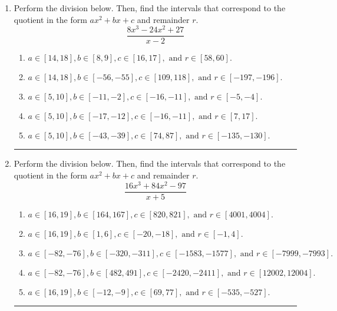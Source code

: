 \documentclass[14pt]{extbook}
\newcommand{\litem}[1]{\item#1\hspace*{-1cm}\rule{\textwidth}{0.4pt}}
\begin{document}
\begin{enumerate}
{\begin{enumerate}[label=\Alph*.]
\end{enumerate} }
\litem{
Perform the division below. Then, find the intervals that correspond to the quotient in the form $ax^2+bx+c$ and remainder $r$.\[ \frac{8x^{3} -24 x^{2} + 27}{x -2} \]\begin{enumerate}[label=\Alph*.]
\item \( a \in [14, 18], b \in [8, 9], c \in [16, 17], \text{ and } r \in [58, 60]. \)
\item \( a \in [14, 18], b \in [-56, -55], c \in [109, 118], \text{ and } r \in [-197, -196]. \)
\item \( a \in [5, 10], b \in [-11, -2], c \in [-16, -11], \text{ and } r \in [-5, -4]. \)
\item \( a \in [5, 10], b \in [-17, -12], c \in [-16, -11], \text{ and } r \in [7, 17]. \)
\item \( a \in [5, 10], b \in [-43, -39], c \in [74, 87], \text{ and } r \in [-135, -130]. \)

\end{enumerate} }
\litem{
Perform the division below. Then, find the intervals that correspond to the quotient in the form $ax^2+bx+c$ and remainder $r$.\[ \frac{16x^{3} +84 x^{2} -97}{x + 5} \]\begin{enumerate}[label=\Alph*.]
\item \( a \in [16, 19], b \in [164, 167], c \in [820, 821], \text{ and } r \in [4001, 4004]. \)
\item \( a \in [16, 19], b \in [1, 6], c \in [-20, -18], \text{ and } r \in [-1, 4]. \)
\item \( a \in [-82, -76], b \in [-320, -311], c \in [-1583, -1577], \text{ and } r \in [-7999, -7993]. \)
\item \( a \in [-82, -76], b \in [482, 491], c \in [-2420, -2411], \text{ and } r \in [12002, 12004]. \)
\item \( a \in [16, 19], b \in [-12, -9], c \in [69, 77], \text{ and } r \in [-535, -527]. \)


\end{enumerate}}
\end{enumerate}
\end{document}
